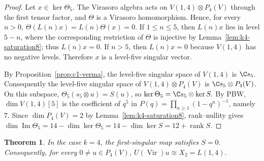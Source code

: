 \documentclass[12pt,leqno]{amsart}
\numberwithin{equation}{section} \newtheorem{thm}{Theorem}[section] \newtheorem{lem}[thm]{Lemma} \newtheorem{ex}[thm]{Example} \newtheorem{prop}[thm]{Proposition} \newtheorem{cor}[thm]{Corollary} \newtheorem{defi}[thm]{Definition} \newtheorem{rmk}[thm]{Remark} \newtheorem{notation}[thm]{Notation}
\newcommand{\Vir}{\operatorname{Vir}}
\begin{document}
\begin{proof}
Let $x\in\ker\Theta_5$. The Virasoro algebra acts on $V(1,4)\otimes P_4(V)$ through the first tensor factor, and $\Theta$ is a Virasoro homomorphism. Hence, for every $n>0$, \(\Theta(L(n)x)=L(n)\Theta(x)=0\). If $1\le n\le5$, then $L(n)x$ lies in level $5-n$, where the corresponding restriction of $\Theta$ is injective by Lemma~\ref{lem:k4-saturation8}; thus $L(n)x=0$. If $n>5$, then $L(n)x=0$ because $V(1,4)$ has no negative levels. Therefore $x$ is a level-five singular vector.

By Proposition~\ref{prop:c1-verma}, the level-five singular space of $V(1,4)$ is $\C s_5$. Consequently the level-five singular space of $V(1,4)\otimes P_4(V)$ is \(\C s_5\otimes P_4(V)\). On this subspace, \(\Theta_5(s_5\otimes u)=S(u)\), so \(\ker\Theta_5=\C s_5\otimes\ker S.\) By PBW, $\dim V(1,4)[5]$ is the coefficient of $q^5$ in \(P(q)=\prod_{n\ge1}(1-q^n)^{-1}\), namely $7$. Since $\dim P_4(V)=2$ by Lemma~\ref{lem:k4-saturation8}, rank--nullity gives \(\dim\operatorname{Im}\Theta_5 =14-\dim\ker\Theta_5 =14-\dim\ker S =12+\operatorname{rank}S\).
\end{proof}

\begin{thm}\label{thm:k4-Szero}
In the case $k=4$, the first-singular map satisfies $S=0$. Consequently, for every $0\ne u\in P_4(V)$, \(U(\Vir)u\cong X_2=L(1,4).\)
\end{thm}
\end{document}
